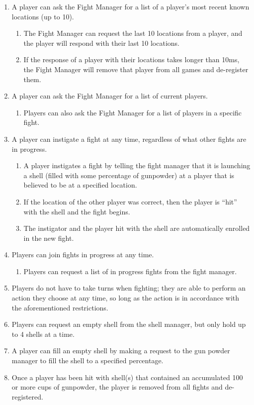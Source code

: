 \documentclass[12pt]{article}
\begin{document}
\begin{enumerate}
	\item{A player can ask the Fight Manager for a list of a player’s most recent known locations (up to 10).}
	\begin{enumerate}
		\item{The Fight Manager can request the last 10 locations from a player, and the player will respond with their last 10 locations.}
		\item{If the response of a player with their locations takes longer than 10ms, the Fight Manager will remove that player from all games and de-register them. }
	\end{enumerate}
	
	\item{A player can ask the Fight Manager for a list of current players.}
	\begin{enumerate}
		\item{Players can also ask the Fight Manager for a list of players in a specific fight.}
	\end{enumerate}
	
	\item{A player can instigate a fight at any time, regardless of what other fights are in progress.}
	\begin{enumerate}
		\item{A player instigates a fight by telling the fight manager that it is launching a shell (filled with some percentage of gunpowder) at a player that is believed to be at a specified location.}
		\item{If the location of the other player was correct, then the player is “hit” with the shell and the fight begins.}
		\item{The instigator and the player hit with the shell are automatically enrolled in the new fight.}
	\end{enumerate}
	
	\item{Players can join fights in progress at any time.}
	\begin{enumerate}
		\item{Players can request a list of in progress fights from the fight manager.}
	\end{enumerate}
	
	\item{Players do not have to take turns when fighting; they are able to perform an action they choose at any time, so long as the action is in accordance with the aforementioned restrictions.}
	
	\item{Players can request an empty shell from the shell manager, but only hold up to 4 shells at a time.}
	
	\item{A player can fill an empty shell by making a request to the gun powder manager to fill the shell to a specified percentage.}


	
	\item{Once a player has been hit with shell(s) that contained an accumulated 100 or more cups of gunpowder, the player is removed from all fights and de-registered.}
	
\end{enumerate}
\end{document}
